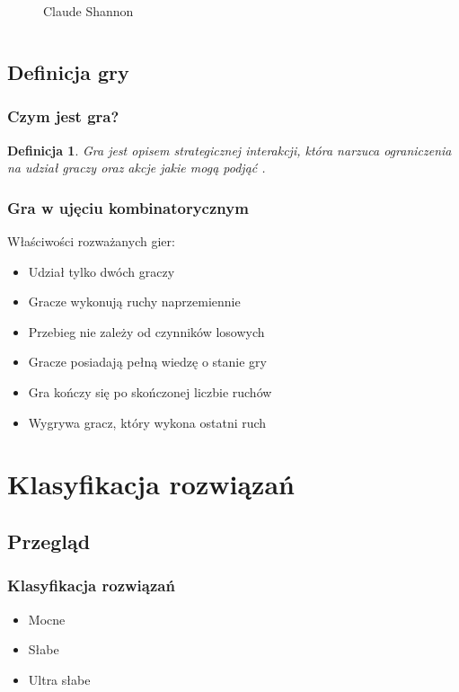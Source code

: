 \documentclass[polish,envcountsect,10pt]{beamer}
\newtheorem{mdfn}{Definicja}
\begin{document}
\begin{frame}
\begin{columns}
\begin{figure}[H]
                        \caption{Claude Shannon}
                    \end{figure}
                \end{columns}
            \end{frame}
        \subsection{Definicja gry}
            \begin{frame}
                \frametitle{Czym jest gra?}
                    \begin{mdfn}
                        Gra jest opisem strategicznej interakcji, która narzuca ograniczenia na udział graczy oraz akcje jakie mogą podjąć \cite{course_gt}.
                    \end{mdfn}
            \end{frame}
            \begin{frame}
                \frametitle{Gra w ujęciu kombinatorycznym}
                Właściwości rozważanych gier:
                \begin{itemize}
                    \item<2-> Udział tylko dwóch graczy
                    \item<3-> Gracze wykonują ruchy naprzemiennie
                    \item<4-> Przebieg nie zależy od czynników losowych
                    \item<5-> Gracze posiadają pełną wiedzę o stanie gry
                    \item<6-> Gra kończy się po skończonej liczbie ruchów
                    \item<7-> Wygrywa gracz, który wykona ostatni ruch
                \end{itemize}
            \end{frame}
    \section{Klasyfikacja rozwiązań}
        \subsection{Przegląd}
            \begin{frame}
                \frametitle{Klasyfikacja rozwiązań}
                \begin{itemize}
                    \item<1-> Mocne
                    \item<2-> Słabe
                    \item<3-> Ultra słabe
                \end{itemize}
            \end{frame}
\end{document}
